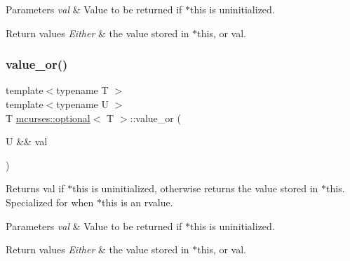 \begin{DoxyParams}{Parameters}
{\em val} & Value to be returned if $\ast$this is uninitialized. \\
\hline
\end{DoxyParams}

\begin{DoxyRetVals}{Return values}
{\em Either} & the value stored in $\ast$this, or val. \\
\hline
\end{DoxyRetVals}
\hypertarget{classmcurses_1_1optional_a968ace3f586642b1ddc54520e8a1e64d}{}\label{classmcurses_1_1optional_a968ace3f586642b1ddc54520e8a1e64d} 
\subsubsection{\texorpdfstring{value\+\_\+or()}{value\_or()}\hspace{0.1cm}{\footnotesize\ttfamily [2/2]}}
{\footnotesize\ttfamily template$<$typename T $>$ \\
template$<$typename U $>$ \\
T \hyperlink{classmcurses_1_1optional}{mcurses\+::optional}$<$ T $>$\+::value\+\_\+or (\begin{DoxyParamCaption}\item[{U \&\&}]{val }\end{DoxyParamCaption})}

Returns val if $\ast$this is uninitialized, otherwise returns the value stored in $\ast$this. Specialized for when $\ast$this is an rvalue.


\begin{DoxyParams}{Parameters}
{\em val} & Value to be returned if $\ast$this is uninitialized. \\
\hline
\end{DoxyParams}

\begin{DoxyRetVals}{Return values}
{\em Either} & the value stored in $\ast$this, or val. \\
\hline
\end{DoxyRetVals}
\hypertarget{classmcurses_1_1optional_a10bd1d21490f5ad196e3cdaa75e8fe5e}{}\label{classmcurses_1_1optional_a10bd1d21490f5ad196e3cdaa75e8fe5e} 
